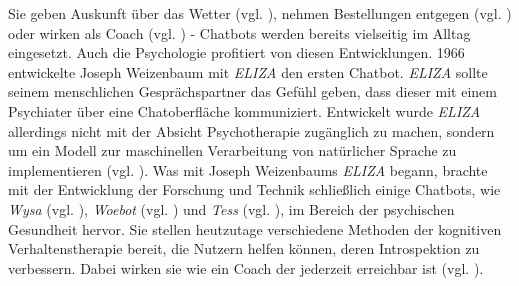 


Sie geben Auskunft über das Wetter (vgl. \cite{GoogleAl38:online}), nehmen Bestellungen entgegen (vgl. \cite{KassenSc50:online}) oder wirken als Coach (vgl. \cite{Wysayour57:online}) - Chatbots werden bereits vielseitig im Alltag eingesetzt. Auch die Psychologie profitiert von diesen Entwicklungen. 1966 entwickelte Joseph Weizenbaum mit \emph{ELIZA} den ersten Chatbot. \emph{ELIZA} sollte seinem menschlichen Gesprächspartner das Gefühl geben, dass dieser mit einem Psychiater über eine Chatoberfläche kommuniziert. Entwickelt wurde \emph{ELIZA} allerdings nicht mit der Absicht  Psychotherapie zugänglich zu machen, sondern um ein Modell zur maschinellen Verarbeitung von natürlicher Sprache zu implementieren (vgl. \cite{Weizenbaum1966}). Was mit Joseph Weizenbaums \emph{ELIZA} begann, brachte mit der Entwicklung der Forschung und Technik schließlich einige Chatbots, wie \emph{Wysa} (vgl. \cite{Wysayour57:online}), \emph{Woebot} (vgl. \cite{WoebotYo93:online}) und \emph{Tess} (vgl. \cite{TessArti99:online}), im Bereich der psychischen Gesundheit hervor. Sie stellen heutzutage verschiedene Methoden der kognitiven Verhaltenstherapie bereit, die Nutzern helfen können, deren Introspektion zu verbessern. Dabei wirken sie wie ein Coach der jederzeit erreichbar ist (vgl. \cite{Fitzpatrick2017}).  

